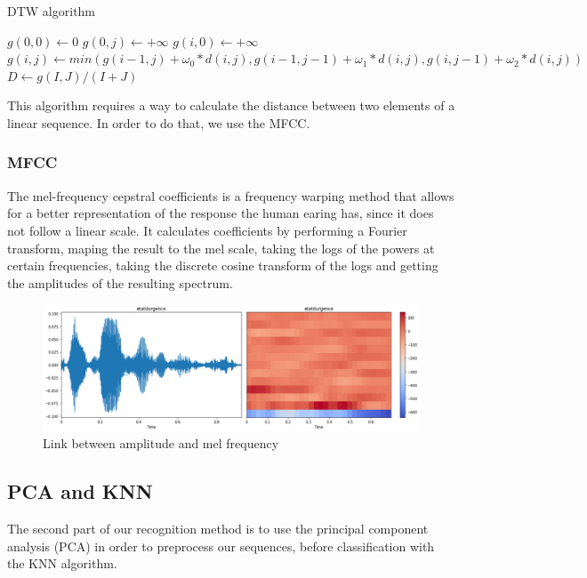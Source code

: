 \documentclass[%
  report,%
  10pt,%
  a4paper,%
  fleqn,%
  oneside,%
  sumario = tradicional,%
  chapter = TITLE,%
  section = TITLE,%
]{abntex2}
\begin{document}
\begin{algorithm}
  \caption{DTW algorithm}\label{euclid}
  \begin{algorithmic}
    \State $g(0, 0) \gets 0$
    \State $g(0, j) \gets +\infty$
    \EndFor
    \State $g(i, 0) \gets +\infty$
    \State $g(i, j) \gets min(g(i - 1, j) + \omega_{0} * d(i, j), g(i - 1, j - 1) + \omega_{1} * d(i, j), g(i, j - 1) + \omega_{2} * d(i, j))$
    \EndFor
    \EndFor
    \State $D \gets g(I, J) / (I + J)$
  \end{algorithmic}
\end{algorithm}

This algorithm requires a way to calculate the distance between two elements of a linear sequence.
In order to do that, we use the MFCC.

\subsubsection{MFCC}

The mel-frequency cepstral coefficients is a frequency warping method that allows for a better representation of the response the human earing has, since it does not follow a linear scale.
It calculates coefficients by performing a Fourier transform, maping the result to the mel scale, taking the logs of the powers at certain frequencies, taking the discrete cosine transform of the logs and getting the amplitudes of the resulting spectrum.

\begin{figure}[H]
  \centering
  \caption{Link between amplitude and mel frequency}
  \label{fig:mfcc}
  \includegraphics[width = 0.5\columnwidth]{./Figuras/mfcc}
\end{figure}

\subsection{PCA and KNN}

The second part of our recognition method is to use the principal component analysis (PCA) in order to preprocess our sequences, before classification with the KNN algorithm.
\end{document}
